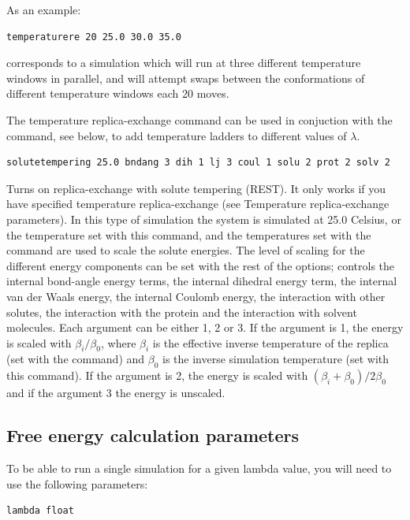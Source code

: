 \documentclass[letterpaper,10pt,english]{manual}
\begin{document}
As an example:

\begin{Verbatim}[commandchars=@\[\]]
temperaturere 20 25.0 30.0 35.0
\end{Verbatim}

corresponds to a simulation which will run at three different temperature windows in parallel, and will attempt swaps between the conformations of different temperature windows each 20 moves.

The temperature replica-exchange command can be used in conjuction with the  command, see below, to add temperature ladders to different values of $\lambda$.
\begin{Verbatim}[commandchars=@\[\]]
solutetempering 25.0 bndang 3 dih 1 lj 3 coul 1 solu 2 prot 2 solv 2
\end{Verbatim}

Turns on replica-exchange with solute tempering (REST). It only works if you have specified temperature replica-exchange (see Temperature replica-exchange parameters). In this type of simulation the system is simulated at 25.0 Celsius, or the temperature set with this command, and the temperatures set with the  command are used to scale the solute energies. The level of scaling for the different energy components can be set with the rest of the options;  controls the internal bond-angle energy terms,  the internal dihedral energy term,  the internal van der Waals energy,  the internal Coulomb energy,  the interaction with other solutes,  the interaction with the protein and  the interaction with solvent molecules. Each argument can be either 1, 2 or 3. If the argument is 1, the energy is scaled with $\beta_i/\beta_0$, where $\beta_i$ is the effective inverse temperature of the replica (set with the  command) and $\beta_0$ is the inverse simulation temperature (set with this command). If the argument is 2, the energy is scaled with $(\beta_i+\beta_0)/2\beta_0$ and if the argument 3 the energy is unscaled.


\subsection{Free energy calculation parameters}

To be able to run a single simulation for a given lambda value, you will need to use the following parameters:
\begin{Verbatim}[commandchars=@\[\]]
lambda float
\end{Verbatim}
\end{document}
